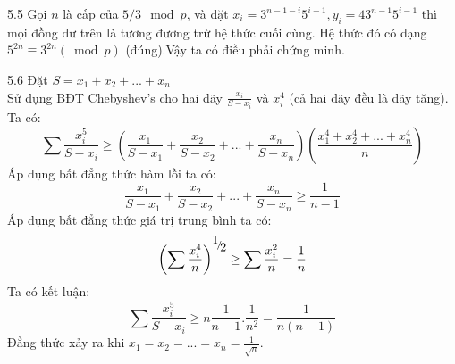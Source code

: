 \begin{Answer}{5.5}
 Gọi $n$ là cấp của $5/3 \mod p$, và đặt $x_i=3^{n-1-i}5^{i-1}, y_i=43^{n-1}5^{i-1}$ thì mọi đồng dư trên là tương đương trừ hệ thức cuối cùng. Hệ thức đó có dạng $5^{2n}  \equiv 3^{2n} \left( {\bmod p} \right)$ (đúng).Vậy ta có điều phải chứng minh.
\end{Answer}
\begin{Answer}{5.6}
 Đặt $S=x_1+x_2+...+x_n$\\
Sử dụng BĐT Chebyshev's cho hai dãy $\frac{{x_i }}{{S - x_i }}$ và $x_i^4 $ (cả hai dãy đều là dãy tăng). Ta có:
$$ \sum {\frac{{x_i^5 }}{{S - x_i }} \ge \left( {\frac{{x_1 }}{{S - x_1 }} + \frac{{x_2 }}{{S - x_2 }} + ... + \frac{{x_n }}{{S - x_n }}} \right)} \left( {\frac{{x_1^4  + x_2^4  + ... + x_n^4 }}{n}} \right) $$
Áp dụng bất đẳng thức hàm lồi ta có:
$$\frac{{x_1 }}{{S - x_1 }} + \frac{{x_2 }}{{S - x_2 }} + ... + \frac{{x_n }}{{S - x_n }} \ge \frac{1}{{n - 1}}  $$
Áp dụng bất đẳng thức giá trị trung bình ta có:
$$ \left( {\sum {\frac{{x_i^4 }}{n}} } \right)^{{\raise0.7ex\hbox{$1$} \!\mathord{\left/
 {\vphantom {1 2}}\right.\kern-\nulldelimiterspace}
\!\lower0.7ex\hbox{$2$}}}  \ge \sum {\frac{{x_i^2 }}{n}}  = \frac{1}{n} $$
Ta có kết luận:
$$ \sum {\frac{{x_i^5 }}{{S - x_i }}}  \ge n\frac{1}{{n - 1}}.\frac{1}{{n^2 }} = \frac{1}{{n\left( {n - 1} \right)}} $$
Đẳng thức xảy ra khi $x_1  = x_2  = ... = x_n  = \frac{1}{{\sqrt n }}$.
\end{Answer}
